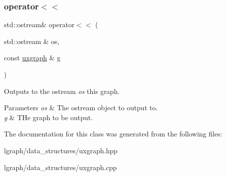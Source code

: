 \subsubsection{\texorpdfstring{operator$<$$<$}{operator<<}}
{\footnotesize\ttfamily std\+::ostream\& operator$<$$<$ (\begin{DoxyParamCaption}\item[{std\+::ostream \&}]{os,  }\item[{const \hyperlink{classlgraph_1_1uxgraph}{uxgraph} \&}]{g }\end{DoxyParamCaption})\hspace{0.3cm}{\ttfamily [friend]}}



Outputs to the ostream {\itshape os} this graph. 


\begin{DoxyParams}{Parameters}
{\em os} & The ostream object to output to. \\
\hline
{\em g} & T\+He graph to be output. \\
\hline
\end{DoxyParams}


The documentation for this class was generated from the following files\+:\begin{DoxyCompactItemize}
\item 
lgraph/data\+\_\+structures/uxgraph.\+hpp\item 
lgraph/data\+\_\+structures/uxgraph.\+cpp\end{DoxyCompactItemize}
